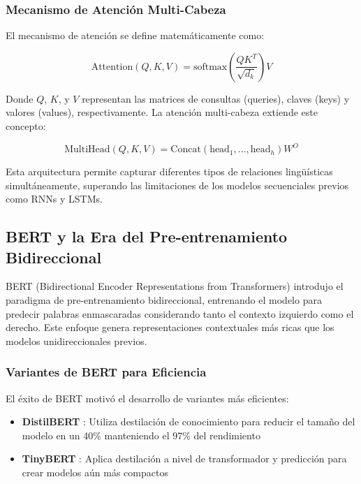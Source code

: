 \subsubsection{Mecanismo de Atención Multi-Cabeza}

El mecanismo de atención se define matemáticamente como:

\begin{equation}
\text{Attention}(Q,K,V) = \text{softmax}\left(\frac{QK^T}{\sqrt{d_k}}\right)V
\end{equation}

Donde $Q$, $K$, y $V$ representan las matrices de consultas (queries), claves (keys) y valores (values), respectivamente. La atención multi-cabeza extiende este concepto:

\begin{equation}
\text{MultiHead}(Q,K,V) = \text{Concat}(\text{head}_1, ..., \text{head}_h)W^O
\end{equation}

Esta arquitectura permite capturar diferentes tipos de relaciones lingüísticas simultáneamente, superando las limitaciones de los modelos secuenciales previos como RNNs y LSTMs.

\subsection{BERT y la Era del Pre-entrenamiento Bidireccional}

BERT (Bidirectional Encoder Representations from Transformers) \cite{devlin2018bert} introdujo el paradigma de pre-entrenamiento bidireccional, entrenando el modelo para predecir palabras enmascaradas considerando tanto el contexto izquierdo como el derecho. Este enfoque genera representaciones contextuales más ricas que los modelos unidireccionales previos.

\subsubsection{Variantes de BERT para Eficiencia}

El éxito de BERT motivó el desarrollo de variantes más eficientes:
\begin{itemize}
    \item \textbf{DistilBERT} \cite{sanh2019distilbert}: Utiliza destilación de conocimiento para reducir el tamaño del modelo en un 40\% manteniendo el 97\% del rendimiento
    \item \textbf{TinyBERT} \cite{jiao2019tinybert}: Aplica destilación a nivel de transformador y predicción para crear modelos aún más compactos
\end{itemize}

